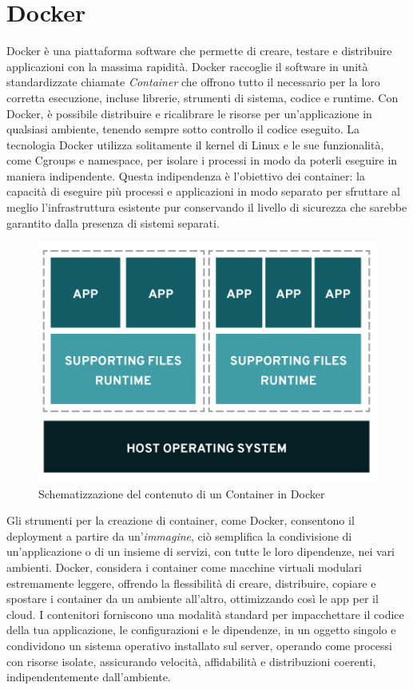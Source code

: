 \section{Docker}
Docker è una piattaforma software che permette di creare, testare e distribuire applicazioni con la massima rapidità. Docker raccoglie 
il software in unità standardizzate chiamate \textit{Container} che offrono tutto il necessario per la loro corretta esecuzione, incluse librerie, 
strumenti di sistema, codice e runtime. Con Docker, è possibile distribuire e ricalibrare le risorse per un'applicazione in qualsiasi ambiente, 
tenendo sempre sotto controllo il codice eseguito.\hfill\break
La tecnologia Docker utilizza solitamente il kernel di Linux e le sue funzionalità, come Cgroups e namespace, per isolare i processi in modo da poterli 
eseguire in maniera indipendente. Questa indipendenza è l'obiettivo dei container: la capacità di eseguire più processi e applicazioni in 
modo separato per sfruttare al meglio l'infrastruttura esistente pur conservando il livello di sicurezza che sarebbe garantito dalla 
presenza di sistemi separati.
%
\begin{figure}[ht!]
    \centering
    \includegraphics[scale=0.7]{images/Docker_Config_Container.png}
    \caption{Schematizzazione del contenuto di un Container in Docker}
    \label{fig:DCC}
\end{figure}
\hfill \break
Gli strumenti per la creazione di container, come Docker, consentono il deployment a partire da un'\textit{immagine}, ciò semplifica la condivisione di 
un'applicazione o di un insieme di servizi, con tutte le loro dipendenze, nei vari ambienti.
Docker, considera i container come macchine virtuali modulari estremamente leggere, offrendo la flessibilità di creare, distribuire, 
copiare e spostare i container da un ambiente all'altro, ottimizzando così le app per il cloud.\hfill\break
I contenitori forniscono una modalità standard per impacchettare il codice della tua applicazione, le configurazioni e le dipendenze, in un oggetto singolo e 
condividono un sistema operativo installato sul server, operando come processi con risorse isolate, assicurando velocità, affidabilità e distribuzioni coerenti, 
indipendentemente dall’ambiente.
%
